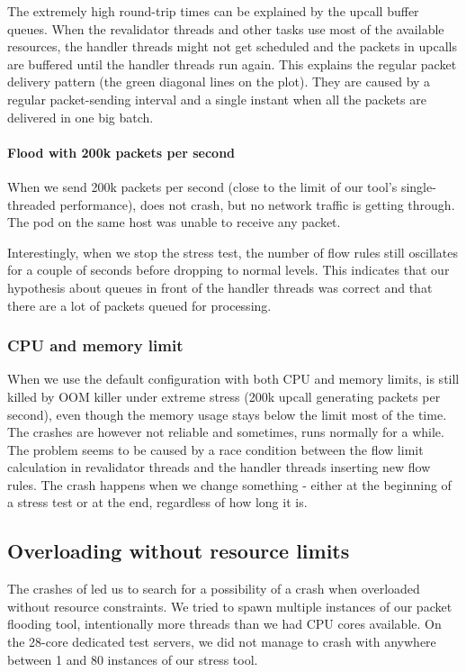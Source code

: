 The extremely high round-trip times can be explained by the upcall buffer queues. When the revalidator threads and other tasks use most of the available resources, the handler threads might not get scheduled and the packets in upcalls are buffered until the handler threads run again. This explains the regular packet delivery pattern (the green diagonal lines on the plot). They are caused by a regular packet-sending interval and a single instant when all the packets are delivered in one big batch.

\paragraph{Flood with 200k packets per second}
When we send 200k packets per second (close to the limit of our tool's single-threaded performance),  does not crash, but no network traffic is getting through. The  pod on the same host was unable to receive any packet.

Interestingly, when we stop the stress test, the number of flow rules still oscillates for a couple of seconds before dropping to normal levels. This indicates that our hypothesis about queues in front of the handler threads was correct and that there are a lot of packets queued for processing. 

\subsubsection{CPU and memory limit}

When we use the default configuration with both CPU and memory limits,  is still killed by OOM killer under extreme stress (200k upcall generating packets per second), even though the memory usage stays below the limit most of the time. The crashes are however not reliable and sometimes,  runs normally for a while. The problem seems to be caused by a race condition between the flow limit calculation in revalidator threads and the handler threads inserting new flow rules. The crash happens when we change something - either at the beginning of a stress test or at the end, regardless of how long it is.

\subsection{Overloading  without resource limits}

The crashes of  led us to search for a possibility of a crash when overloaded without resource constraints. We tried to spawn multiple instances of our packet flooding tool, intentionally more threads than we had CPU cores available. On the 28-core dedicated test servers, we did not manage to crash  with anywhere between 1 and 80 instances of our stress tool.

